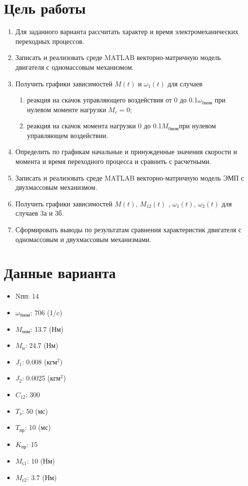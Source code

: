 \section{Цель работы}
\begin{enumerate}
    \item Для заданного варианта рассчитать характер и время электромеханических
    переходных процессов.
    \item Записать и реализовать среде MATLAB векторно-матричную модель двигателя с
    одномассовым механизмом.
    \item Получить графики зависимостей $M(t)$ и $\omega_1(t)$ для случаев
     \begin{enumerate}
              \item реакция на скачок управляющего воздействия от 0 до 0.1$\omega_{\text{0ном}}$  при нулевом моменте
              нагрузки $M_c=0$;
              \item реакция на скачок момента нагрузки  0 до 0.1$M_{\text{0ном}}$при нулевом управляющем
              воздействии.
    \end{enumerate}
    \item Определить по графикам начальные и принужденные значения скорости и момента и
    время переходного процесса и сравнить с расчетными.
    \item Записать и реализовать среде MATLAB векторно-матричную модель ЭМП с
    двухмассовым механизмом.
    \item Получить графики зависимостей $M(t)$, $M_{12}(t)$ , $\omega_1(t)$, $\omega_2(t)$ для случаев 3а и 3б.
    \item Сформировать выводы по результатам сравнения характеристик двигателя с
    одномассовым и двухмассовым механизмами.
\end{enumerate}



\section{Данные варианта}
\begin{itemize}
    \item Nпп: 14
    \item $\omega_\text{0ном}$: 706 (1/c)
    \item $M_\text{ном}$: 13.7 (Нм)
    \item $M_\text{п}$: 24.7 (Нм)
    \item $J_\text{1}$: 0.008 (кгм$^2$)
    \item $J_\text{2}$: 0.0025 (кгм$^2$)
    \item $C_\text{12}$: 300
    \item $T_\text{э}$: 50 (мс)
    \item $T_\text{пр}$: 10 (мс)
    \item $K_\text{пр}$: 15
    \item $M_\text{с1}$: 10 (Нм)
    \item $M_\text{с2}$: 3.7 (Нм)
\end{itemize}
\newpage